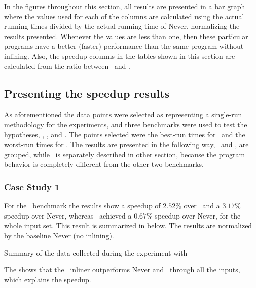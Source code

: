 
In the figures throughout this section, all results are presented in a bar graph where the values used for each of the columns are calculated using the actual running times divided by the actual running time of Never, normalizing the results presented. Whenever the values are less than one, then these particular programs have a better (faster) performance than the same program without inlining. Also, the speedup columns in the tables shown in this section are calculated from the ratio between \FDI\ and \llvm.%

\subsection{Presenting the speedup results}
\label{sec:speedupresult}

As aforementioned the data points were selected as representing a single-run methodology for the experiments, and three benchmarks were used to test the hypotheses, \bzip, \gzip, and \gcc. The points selected were the best-run times for \FDI\ and the worst-run times for \llvm. The results are presented in the following way, \bzip\ and \gzip, are grouped, while \gcc\ is separately described in other section, because the program behavior is completely different from the other two benchmarks.

\subsubsection{Case Study 1 \gcc}

For the \gcc\ benchmark the results show a speedup of $2.52 \%$ over \llvm\, and a $3.17 \%$ speedup over Never, whereas \llvm\ achieved a $0.67 \%$ speedup over Never, for the whole input set. This result is summarized in  below. The results are normalized by the baseline Never (no inlining).

\begin{table}
  \centering
  \begin{tiny}
  
  \end{tiny}
  \caption{Summary of the data collected during the experiment with \gcc}
  \label{tab:speedupgcc}
\end{table}

The  shows that the \FDI\ inliner outperforms Never and \llvm\ through all the inputs, which explains the speedup.


